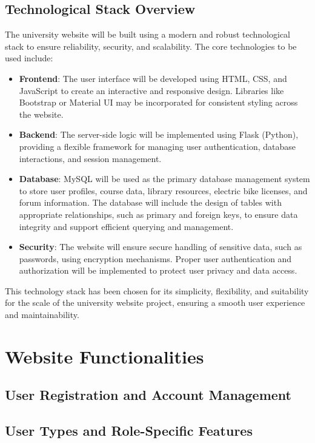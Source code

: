 \documentclass[12pt]{article}
\begin{document}
\subsection{Technological Stack Overview}
The university website will be built using a modern and robust technological stack to ensure reliability, security, and scalability. 
The core technologies to be used include:
\begin{itemize}
    \item \textbf{Frontend}: The user interface will be developed using HTML, CSS, and JavaScript to create an interactive and
     responsive design. Libraries like Bootstrap or Material UI may be incorporated for consistent styling across the website.
    \item \textbf{Backend}: The server-side logic will be implemented using Flask (Python), providing a flexible framework for 
    managing user authentication, database interactions, and session management.
    \item \textbf{Database}: MySQL will be used as the primary database management system to store user profiles, 
    course data, library resources, electric bike licenses, and forum information. The database will include the design of 
    tables with appropriate relationships, such as primary and foreign keys, to ensure data integrity and support efficient 
    querying and management.
    \item \textbf{Security}: The website will ensure secure handling of sensitive data, such as passwords, using encryption 
    mechanisms. Proper user authentication and authorization will be implemented to protect user privacy and data access.
\end{itemize}
This technology stack has been chosen for its simplicity, flexibility, and suitability for the scale of the university website project, 
ensuring a smooth user experience and maintainability.

\newpage
\section{Website Functionalities}
\subsection{User Registration and Account Management}
\subsection{User Types and Role-Specific Features}
\end{document}
